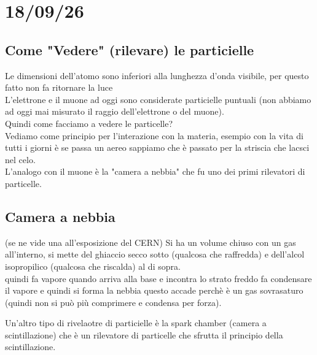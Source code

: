 \documentclass[a4paper, oneside]{article}
\begin{document}
\section{18/09/26}
\subsection{Come "Vedere" (rilevare) le particielle}
Le dimensioni dell'atomo sono inferiori alla lunghezza d'onda visibile, per questo fatto non fa ritornare la luce\\
L'elettrone e il muone ad oggi sono considerate particielle puntuali (non abbiamo ad oggi mai misurato il raggio dell'elettrone o del muone).\\
Quindi come facciamo a vedere le particelle?\\
Vediamo come principio per l'interazione con la materia, esempio con la vita di tutti i giorni è se passa un aereo sappiamo che è passato per la striscia che lacsci nel celo.\\
L'analogo con il muone è la "camera a nebbia" che fu uno dei primi rilevatori di particelle.\\
\subsection{Camera a nebbia} (se ne vide una all'esposizione del CERN)
Si ha un volume chiuso con un gas all'interno, si mette del ghiaccio secco sotto (qualcosa che raffredda) e dell'alcol isopropilico (qualcosa che riscalda) al di sopra.\\
quindi fa vapore quando arriva alla base e incontra lo strato freddo fa condensare il vapore e quindi si forma la nebbia questo accade perchè è un gas sovrasaturo (quindi non si può più comprimere e condensa per forza).\\
\begin{center}
\end{center}

Un'altro tipo di rivelaotre di particielle è la spark chamber (camera a scintillazione) che è un rilevatore di particelle che sfrutta il principio della scintillazione.\\
\end{document}
